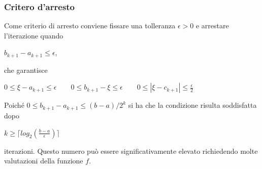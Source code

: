 \documentclass[12pt, letterpaper]{article}
\begin{document}
\subsubsection{Critero d'arresto}
Come criterio di arresto conviene fissare una tolleranza $\epsilon > 0$ e arrestare l'iterazione quando 
\begin{center}
    $b_{k+1}-a_{k+1} \leq \epsilon$,
\end{center}
che garantisce 
\begin{center}
    $ 0 \leq \xi-a_{k+1} \leq \epsilon \qquad 0 \leq b_{k+1}-\xi \leq \epsilon \qquad 0 \leq |\xi-c_{k+1}| \leq \frac{\epsilon}{2}$

\end{center}
Poich\'e $ 0 \leq b_{k+1}-a_{k+1} \leq (b-a)/2^k$ si ha che la condizione risulta soddisfatta dopo 
\begin{center}
    $k \geq \lceil log_2(\frac{b-a}{\epsilon}) \rceil$ 
\end{center}
iterazioni. Questo numero può essere significativamente elevato richiedendo molte valutazioni della funzione $f$.
\end{document}
